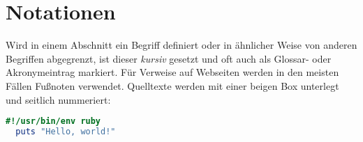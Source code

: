 
\section{Notationen}
\label{sec:intro:notations}

\authors{\JF \and \DH}{\LM \and \MW \and \BK}

Wird in einem Abschnitt ein Begriff definiert oder in ähnlicher Weise
von anderen Begriffen abgegrenzt, ist dieser \textit{kursiv} gesetzt
und oft auch als Glossar- oder Akronymeintrag markiert. Für Verweise
auf Webseiten werden in den meisten Fällen Fußnoten verwendet.
Quelltexte werden mit einer beigen Box unterlegt und seitlich
nummeriert:

\begin{lstlisting}[language=Ruby]
  #!/usr/bin/env ruby
  puts "Hello, world!"
\end{lstlisting}
